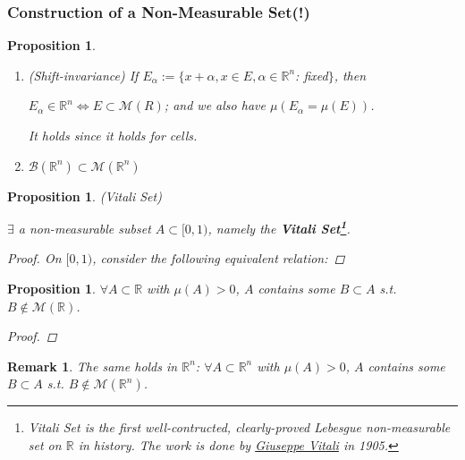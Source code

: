 \documentclass[12pt]{article}
\theoremstyle{blueplain}
\newtheorem{proposition}[theorem]{Proposition}
\theoremstyle{bluedef}
\theoremstyle{blueremark}
\newtheorem{remark}{Remark}[section]
\newcommand{\R}{\mathbb{R}}
\numberwithin{equation}{section}
\begin{document}
\subsubsection{Construction of a Non-Measurable Set(!)}

\begin{proposition}
  \begin{enumerate}
    \item (Shift-invariance) If $E_{\alpha} := \{x+\alpha, x\in E, \alpha \in \R^n$: fixed$\}$, then

          $E_{\alpha} \in \R^n \Leftrightarrow E \subset \mathcal{M}(R)$; and we also have $\mu(E_{\alpha} = \mu(E))$.

          It holds since it holds for cells.

    \item $\mathcal{B}(\R^n) \subset \mathcal{M}(\R^n)$
  \end{enumerate}

\end{proposition}

\begin{proposition}
  (Vitali Set)

  $\exists$ a non-measurable subset $A \subset [0,1)$, namely the \textbf{Vitali Set\footnote[1]{Vitali Set is the first well-contructed, clearly-proved Lebesgue non-measurable set on $\R$ in history. The work is done by \href{https://en.wikipedia.org/wiki/Giuseppe_Vitali}{Giuseppe Vitali}  in 1905.}}.
  \begin{proof}
    On $[0,1)$, consider the following equivalent relation:


  \end{proof}
\end{proposition}





\begin{proposition}
  $\forall A \subset \R$ with $\mu(A)>0$, $A$ contains some $B \subset A$ s.t. $B \notin \mathcal{M}(\R)$.
  \begin{proof}

  \end{proof}

\end{proposition}

\begin{remark}
  The same holds in $\R^n$: $\forall A \subset \R^n$ with $\mu(A)>0$, $A$ contains some $B \subset A$ s.t. $B \notin \mathcal{M}(\R^n)$.
\end{remark}
\end{document}
